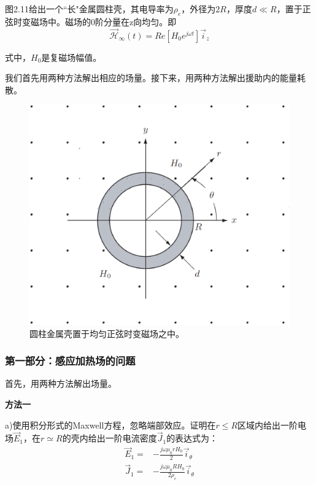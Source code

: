 图2.11给出一个``长"金属圆柱壳，其电导率为$\rho_e$，外径为$2R$，厚度$d\ll R$，置于正弦时变磁场中。磁场的0阶分量在z向均匀。即
\begin{equation*}
\vec{\mathcal{H}}_\infty(t)=Re[H_0 e^{j\omega t}] \vec{i}_z \tag{2.54}
\end{equation*}

式中，$H_0$是复磁场幅值。

我们首先用两种方法解出相应的场量。接下来，用两种方法解出援助内的能量耗散。

\begin{figure}[htbp]
  \centering
 \includegraphics[scale=0.4]{chpt2/figs/fig2.11.eps}
  \caption{圆柱金属壳置于均匀正弦时变磁场之中。}
\end{figure}

\subsubsection*{第一部分：感应加热场的问题}
首先，用两种方法解出场量。

\textbf{方法一}

a)使用积分形式的Maxwell方程，忽略端部效应。证明在$r\le R$区域内给出一阶电场$\vec{E}_1$，在$r\simeq R$的壳内给出一阶电流密度$\vec{J}_1$的表达式为：
\begin{align}
\vec{E}_1=&-\frac{j\omega \mu_0 r H_0}{2} \vec{i}_\theta\\
\vec{J}_1=&-\frac{j\omega \mu_0 R H_0}{2\rho_e} \vec{i}_\theta
\end{align}

